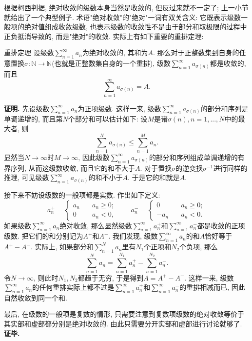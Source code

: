 根据柯西判据, 绝对收敛的级数本身当然是收敛的, 但反过来就不一定了; 上一小节就给出了一个典型例子. 术语"绝对收敛"的"绝对"一词有双关含义: 它既表示级数一般项的绝对值组成收敛级数, 也表示级数的收敛性不是由于部分和取极限的过程中正负抵消导致的, 而是"绝对"的收敛. 实际上有如下重要的重排定理:

\begin{theorem}{重排定理}
设级数$\sum_{n=1}^\infty a_n$为绝对收敛的, 其和为$A$. 那么对于正整数集到自身的任意置换$\sigma:\mathbb{N}\to\mathbb{N}$(也就是正整数集自身的一个重排), 级数$\sum_{n=1}^\infty a_{\sigma(n)}$都是收敛的, 而且
$$
\sum_{n=1}^\infty a_{\sigma(n)}=A.
$$
\end{theorem}

\textbf{证明.} 先设级数$\sum_{n=1}^\infty a_n$为正项级数. 这样一来, 级数$\sum_{n=1}^\infty a_{\sigma(n)}$的部分和序列是单调递增的, 而且第$N$个部分和可以估计如下: 设$M$是诸$\sigma(n),n=1,...,N$中的最大者, 则
$$
\sum_{n=1}^Na_{\sigma(n)}\leq\sum_{n=1}^{M}a_n.
$$
显然当$N\to\infty$时$M\to\infty$, 因此级数$\sum_{n=1}^\infty a_{\sigma(n)}$的部分和序列组成单调递增的有界序列, 从而这级数收敛, 而且它的和不大于$A$. 对于置换$\sigma$的逆变换$\sigma^{-1}$进行同样的推理, 可见级数$\sum_{n=1}^\infty a_{\sigma(n)}$的和不小于$A$. 于是它的和就是$A$.

接下来不妨设级数的一般项都是实数. 作出如下定义:
$$
a_n^+=\left\{\begin{array}{cc}
{a_n}\quad &a_n\geq0;\\
0\quad &a_n<0,
\end{array}\right.
\quad\quad
a_n^-=\left\{\begin{array}{cc}
0\quad &a_n\geq0;\\
-a_n\quad &a_n<0.
\end{array}\right.
$$
如果级数$\sum_{n=1}^\infty a_n$绝对收敛, 那么显然级数$\sum_{n=1}^\infty a_n^+$和$\sum_{n=1}^\infty a_n^-$都是收敛的正项级数. 把它们的和分别记为$A^+$和$A^-$. 我们发现, 级数$\sum_{n=1}^\infty a_n$的和$A$恰好等于$A^+-A^-$. 实际上, 如果部分和$\sum_{n=1}^N a_n$里有$N_1$个正项和$N_2$个负项, 那么
$$
\sum_{n=1}^N a_n=\sum_{n=1}^{N_1} a_n^+-\sum_{n=1}^{N_2} a_n^-.
$$
令$N\to\infty$, 则此时$N_1,N_2$都趋于无穷, 于是得到$A=A^+-A^-$. 这样一来, 级数$\sum_{n=1}^\infty a_n$的任何重排实际上都不过是$\sum_{n=1}^\infty a_n^+$和$\sum_{n=1}^\infty a_n^-$的重排相减而已, 因此自然收敛到同一个和.

最后, 在级数的一般项是复数的情形, 只需要注意到复数项级数的绝对收敛等价于其实部和虚部都分别是绝对收敛的. 由此只需要分开实部和虚部进行讨论就够了. \textbf{证毕.}